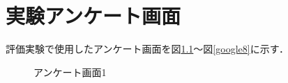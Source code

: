 \chapter{実験アンケート画面}
評価実験で使用したアンケート画面を図\ref{google1}〜図\ref{google8}に示す．

\begin{figure}[tbhp]
  \centering
  \caption{アンケート画面1}
  \label{google1}
\end{figure}

